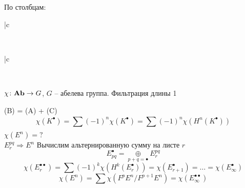 \documentclass[../main.tex]{subfiles}
\begin{document}
По столбцам:
\begin{table}[h!]
\begin{minipage}{.4\linewidth}
\centering
\begin{tabular}{ |c  } 
\bee
{}
\eee\\
 \hline
\end{tabular}
\end{minipage}
\begin{minipage}{.4\linewidth}
\centering
\begin{tabular}{ |c} 
\bee
{}
\eee\\
 \hline
\end{tabular}
\end{minipage}
\end{table}
\begin{to_ex}
$\chi \colon \mathbf{Ab} \to G$, $G$ -- абелева группа. 
Фильтрация длины 1
\bee
{}
\qquad \chi(B) = \chi(A) + \chi(C)
\eee
\[
\chi (K^\bullet) = \sum_{}^{}(-1)^n \chi (K^\bullet) = \sum (-1)^n \chi (H^n(K^\bullet))
\]
$\chi (E^n) = ?$\\
$E^{pq}_r \Rightarrow E^n$
Вычислим альтернированную сумму на листе $r$
\[E_{pq}^{\bullet} = \underset{p+q = \bullet}{\oplus} E_r^{pq}\]
\[\chi (E^{\bullet \bullet}_r) = \sum (-1)^k \chi(H^k(E_r^{\bullet})) = \chi(E_{r+1}^{\bullet}) =\ldots = \chi(E_{\infty}^{\bullet})\]
\[\chi(E^n) = \sum \chi (F^pE^n / F^{p+1}E^n) = \chi(E^{\bullet \bullet}_{\infty})\]
\end{to_ex}
\end{document}
